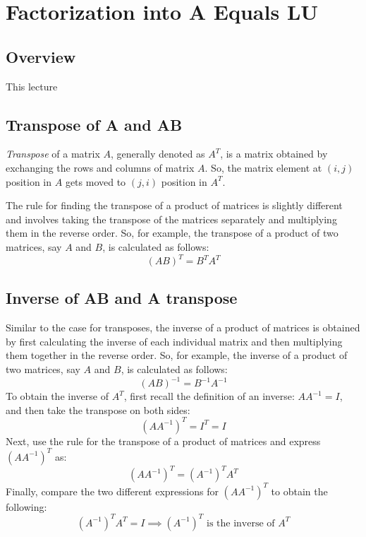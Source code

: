 \documentclass[../main.tex]{subfiles}
\begin{document}
\section{Factorization into A Equals LU}


\subsection{Overview}
This lecture

\subsection{Transpose of A and AB}
\emph{Transpose} of a matrix \(A\), generally denoted as \(A^{T}\), is a matrix obtained by exchanging the rows and columns of matrix \(A\). So, the matrix element at \((i, j)\) position in \(A\) gets moved to \((j, i)\) position in \(A^{T}\).
\vspace{0.5em}

The rule for finding the transpose of a product of matrices is slightly different and involves taking the transpose of the matrices separately and multiplying them in the reverse order. So, for example, the transpose of a product of two matrices, say \(A\) and \(B\), is calculated as follows:
\[
    (AB)^{T} = B^{T}A^{T}
\]


\subsection{Inverse of AB and A transpose}
Similar to the case for transposes, the inverse of a product of matrices is obtained by first calculating the inverse of each individual matrix and then multiplying them together in the reverse order. So, for example, the inverse of a product of two matrices, say \(A\) and \(B\), is calculated as follows:
\[
    (AB)^{-1} = B^{-1}A^{-1}
\]
To obtain the inverse of \(A^{T}\), first recall the definition of an inverse: \(AA^{-1} = I\), and then take the transpose on both sides:
\[
    (AA^{-1})^{T} = I^{T} = I
\]
Next, use the rule for the transpose of a product of matrices and express \((AA^{-1})^{T}\) as:
\[
    (AA^{-1})^{T} = (A^{-1})^{T}A^{T}
\]
Finally, compare the two different expressions for \((AA^{-1})^{T}\) to obtain the following:
\[
    (A^{-1})^{T}A^{T} = I \implies \text{\((A^{-1})^{T}\) is the inverse of \(A^{T}\)}
\]
\vspace{0.5em}
\end{document}

